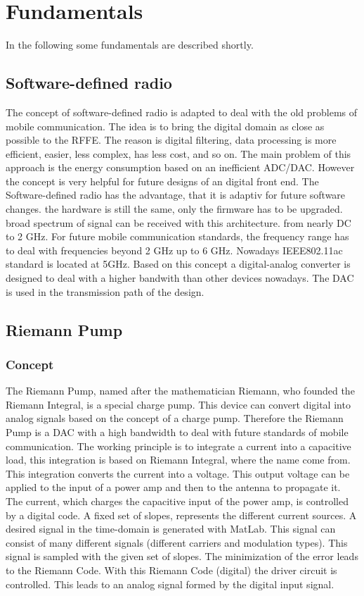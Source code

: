 \chapter{Fundamentals}
In the following some fundamentals are described shortly.
\section{Software-defined radio}
The concept of software-defined radio is adapted to deal with the old problems of mobile communication. The idea is to bring the digital domain as close as possible to the RFFE. The reason is digital filtering, data processing is more efficient, easier, less complex, has less cost, and so on. The main problem of this approach is the energy consumption based on an inefficient ADC/DAC. However the concept is very helpful for future designs of an digital front end. The Software-defined radio has the advantage, that it is adaptiv for future software changes. the hardware is still the same, only the firmware has to be upgraded. broad spectrum of signal can be received with this architecture. from nearly DC to 2 GHz. For future mobile communication standards, the frequency range has to deal with frequencies beyond 2 GHz up to 6 GHz. Nowadays IEEE802.11ac standard is located at 5GHz. Based on this concept a digital-analog converter is designed to deal with a higher bandwith than other devices nowadays. The DAC is used in the transmission path of the design.
\section{Riemann Pump}
\subsection{Concept}
The Riemann Pump, named after the mathematician Riemann, who founded the Riemann Integral, is a special charge pump. This device can convert digital into analog signals based on the concept of a charge pump. Therefore the Riemann Pump is a DAC with a high bandwidth to deal with future standards of mobile communication. The working principle is to
integrate a current into a capacitive load, this integration is based on Riemann Integral, where the name come from. This integration converts the current into a voltage. This output voltage can be applied to the input of a power amp and then to the antenna to propagate it. The current, which charges the capacitive input of the power amp, is controlled by a digital code. A fixed set of slopes, represents the different current sources. A desired signal in the time-domain is generated with MatLab. This signal can consist of many different signals (different carriers and modulation types). This signal is sampled with the given set of slopes. The minimization of the error leads to the Riemann Code. With this Riemann Code (digital) the driver circuit is controlled. This leads to an analog signal formed by the digital input signal. 
